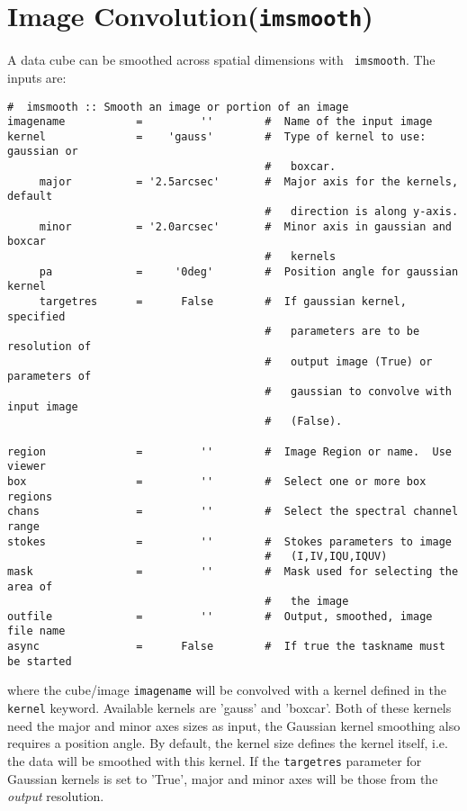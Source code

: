 \section{Image Convolution({\tt imsmooth})}
\label{section:analysis.imsmooth}

A data cube can be smoothed across spatial dimensions with {\tt
  imsmooth}. The inputs are:\\ 
\small
\begin{verbatim}
#  imsmooth :: Smooth an image or portion of an image
imagename           =         ''        #  Name of the input image
kernel              =    'gauss'        #  Type of kernel to use: gaussian or
                                        #   boxcar.
     major          = '2.5arcsec'       #  Major axis for the kernels, default
                                        #   direction is along y-axis.
     minor          = '2.0arcsec'       #  Minor axis in gaussian and boxcar
                                        #   kernels
     pa             =     '0deg'        #  Position angle for gaussian kernel
     targetres      =      False        #  If gaussian kernel, specified
                                        #   parameters are to be resolution of
                                        #   output image (True) or parameters of
                                        #   gaussian to convolve with input image
                                        #   (False).

region              =         ''        #  Image Region or name.  Use viewer
box                 =         ''        #  Select one or more box regions
chans               =         ''        #  Select the spectral channel range
stokes              =         ''        #  Stokes parameters to image
                                        #   (I,IV,IQU,IQUV)
mask                =         ''        #  Mask used for selecting the area of
                                        #   the image
outfile             =         ''        #  Output, smoothed, image file name
async               =      False        #  If true the taskname must be started
\end{verbatim}
\normalsize
where the cube/image {\tt imagename} will be convolved with a kernel
defined in the {\tt kernel} keyword. Available kernels are 'gauss' and
'boxcar'. Both of these kernels need the major and minor axes sizes as
input, the Gaussian kernel smoothing also requires a position
angle. By default, the kernel size defines the kernel itself, i.e. the
data will be smoothed with this kernel. If the {\tt targetres} parameter
for Gaussian kernels is set to 'True', major and minor axes will be
those from the {\it output} resolution. 

